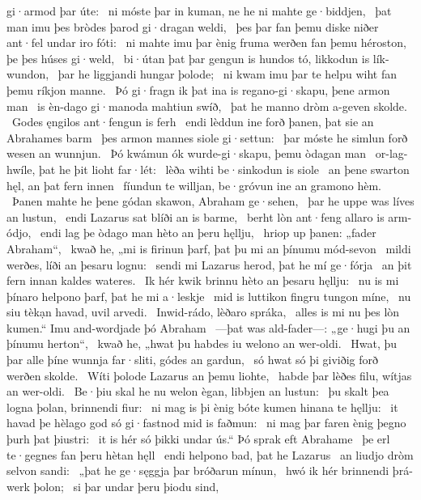 gi·armod þar úte: \hld\ ni móste þar in kuman,
ne he ni mahte ge·biddjen, \hld\ þat man imu þes bròdes þarod
gi·dragan weldi, \hld\ þes þar fan þemu diske niðer
ant·fel undar iro fóti: \hld\ ni mahte imu þar ènig fruma werðen
fan þemu héroston, þe þes húses gi·weld, \hld\ bi·útan þat þar gengun is hundos tó,
likkodun is lík-wundon, \hld\ þar he liggjandi
hungar þolode; \hld\ ni kwam imu þar te helpu wiht
fan þemu ríkjon manne. \hld\ Þó gi·fragn ik þat ina is regano-gi·skapu,
þene armon man \hld\ is èn-dago
gi·manoda mahtiun swíð, \hld\ þat he manno dròm
a-geven skolde. \hld\ Godes ęngilos
ant·fengun is ferh \hld\ endi lèddun ine forð þanen,
þat sie an Abrahames barm \hld\ þes armon mannes
siole gi·settun: \hld\ þar móste he simlun forð
wesen an wunnjun. \hld\ Þó kwámun ók wurde-gi·skapu,
þemu òdagan man \hld\ or-lag-hwíle,
þat he þit lioht far·lét: \hld\ lèða wihti
be·sinkodun is siole \hld\ an þene swarton hęl,
an þat fern innen \hld\ fíundun te willjan,
be·gróvun ine an gramono hèm. \hld\ Þanen mahte he þene gódan skawon,
Abraham ge·sehen, \hld\ þar he uppe was
líves an lustun, \hld\ endi Lazarus sat
blíði an is barme, \hld\ berht lòn ant·feng
allaro is arm-ódjo, \hld\ endi lag þe òdago man
hèto an þeru hęllju, \hld\ hriop up þanen:
„fader Abraham“, \hld\ kwað he, „mi is firinun þarf,
þat þu mi an þínumu mód-sevon \hld\ mildi werðes,
líði an þesaru lognu: \hld\ sendi mi Lazarus herod,
þat he mí ge·fórja \hld\ an þit fern innan
kaldes wateres. \hld\ Ik hér kwik brinnu
hèto an þesaru hęllju: \hld\ nu is mi þínaro helpono þarf,
þat he mi a·leskje \hld\ mid is luttikon fingru
tungon míne, \hld\ nu siu tèkạn havad,
uvil arvedi. \hld\ Inwid-rádo,
lèðaro spráka, \hld\ alles is mi nu þes lòn kumen.“
Imu and-wordjade þó Abraham \hld\ —þat was ald-fader—:
„ge·hugi þu an þínumu herton“, \hld\ kwað he, „hwat þu habdes iu
welono an wer-oldi. \hld\ Hwat, þu þar alle þíne wunnja far·sliti,
gódes an gardun, \hld\ só hwat só þi giviðig forð
werðen skolde. \hld\ Wíti þolode
Lazarus an þemu liohte, \hld\ habde þar lèðes filu,
wítjas an wer-oldi. \hld\ Be·þiu skal he nu welon ègan,
libbjen an lustun: \hld\ þu skalt þea logna þolan,
brinnendi fiur: \hld\ ni mag is þi ènig bóte kumen
hinana te hęllju: \hld\ it havad þe hèlago god
só gi·fastnod mid is faðmun: \hld\ ni mag þar faren ènig
þegno þurh þat þiustri: \hld\ it is hér só þikki undar ús.“
Þó sprak eft Abrahame \hld\ þe erl te·gegnes
fan þeru hètan hęll \hld\ endi helpono bad,
þat he Lazarus \hld\ an liudjo dròm
selvon sandi: \hld\ „þat he ge·sęggja þar
bróðarun mínun, \hld\ hwó ik hér brinnendi
þrá-werk þolon; \hld\ si þar undar þeru þiodu sind,

